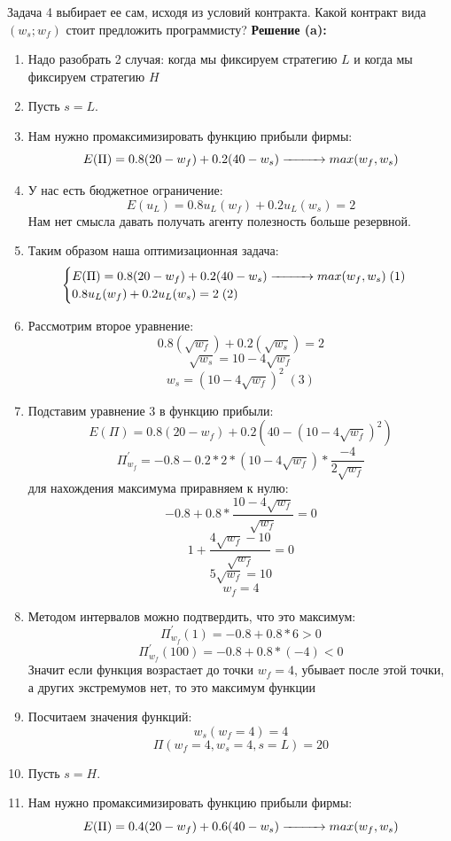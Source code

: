 \begin{mybox}{Задача 4}
    выбирает ее сам, исходя из условий контракта. Какой контракт вида $(w_s;w_f)$ стоит предложить программисту?
    \tcblower
    \textbf{Решение (a):}
    \begin{enumerate}
        \item Надо разобрать 2 случая: когда мы фиксируем стратегию $L$ и когда мы фиксируем стратегию $H$
        \item Пусть $s=L$.
        \item Нам нужно промаксимизировать функцию прибыли фирмы:
        $$E(\Pi)=0.8(20-w_f)+0.2(40-w_s)\xrightarrow{\makebox[1cm]{}} max(w_f,w_s)$$
        \item У нас есть бюджетное ограничение: $$E(u_L)=0.8u_L(w_f)+0.2u_L(w_s)=2$$ Нам нет смысла давать получать
        агенту полезность больше резервной.
        \item Таким образом наша оптимизационная задача: $$\begin{cases}
            E(\Pi)=0.8(20-w_f)+0.2(40-w_s)\xrightarrow{\makebox[1cm]{}} max(w_f,w_s) \;(1)\\
            0.8u_L(w_f)+0.2u_L(w_s)=2\; (2) \\
        \end{cases}$$
        \item Рассмотрим второе уравнение: $$0.8(\sqrt{w_f})+0.2(\sqrt{w_s})=2$$
        $$\sqrt{w_s}=10-4\sqrt{w_f}$$
        $$w_s=(10-4\sqrt{w_f})^2\;(3)$$
        \item Подставим уравнение 3 в функцию прибыли: $$E(\Pi)=0.8(20-w_f)+0.2(40-(10-4\sqrt{w_f})^2)$$
        $$\Pi^{'}_{w_f}=-0.8-0.2*2*(10-4\sqrt{w_f})*\frac{-4}{2\sqrt{w_f}}$$ для нахождения максимума приравняем к
        нулю:
        $$-0.8+0.8*\frac{10-4\sqrt{w_f}}{\sqrt{w_f}}=0$$
        $$1+\frac{4\sqrt{w_f}-10}{\sqrt{w_f}}=0$$
        $$5\sqrt{w_f}=10$$
        $$w_f=4$$
        \item Методом интервалов можно подтвердить, что это максимум:
        $$\Pi^{'}_{w_f}(1)=-0.8+0.8*6>0$$
        $$\Pi^{'}_{w_f}(100)=-0.8+0.8*(-4)<0$$
        Значит если функция возрастает до точки $w_f=4$, убывает после этой точки, а других экстремумов нет, то это
        максимум функции
        \item Посчитаем значения функций: $$w_s(w_f=4)=4$$
        $$\Pi(w_f=4, w_s=4, s=L)=20$$
        \item Пусть $s=H$.
        \item Нам нужно промаксимизировать функцию прибыли фирмы:
        $$E(\Pi)=0.4(20-w_f)+0.6(40-w_s)\xrightarrow{\makebox[1cm]{}} max(w_f,w_s)$$

\end{enumerate}
\end{mybox}
